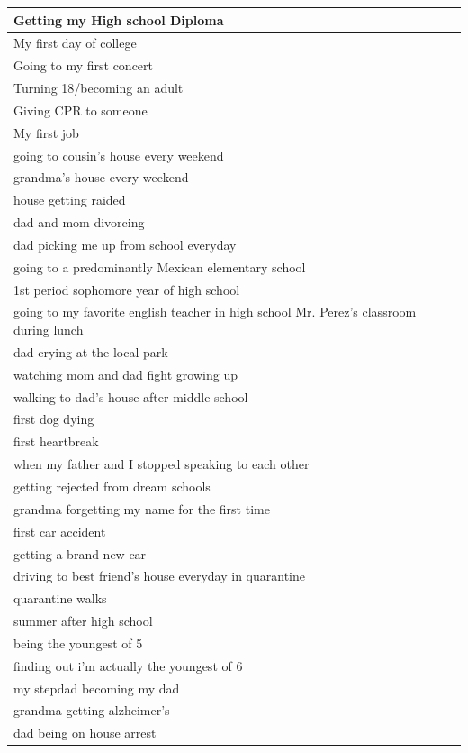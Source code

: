 \documentclass[
  .7em,
  letterpaper,
  DIV=11,
  numbers=noendperiod]{scrartcl}
\begin{document}
\begin{table}
\begin{tabular}{l}
\hline
Getting my High school Diploma\\
\hline
My first day of college\\
\hline
Going to my first concert\\
\hline
Turning 18/becoming an adult\\
\hline
Giving CPR to someone\\
\hline
My first job\\
\hline
going to cousin's house every weekend\\
\hline
grandma's house every weekend\\
\hline
house getting raided\\
\hline
dad and mom divorcing\\
\hline
dad picking me up from school everyday\\
\hline
going to a predominantly Mexican elementary school\\
\hline
1st period sophomore year of high school\\
\hline
going to my favorite english teacher in high school Mr. Perez's classroom during lunch\\
\hline
dad crying at the local park\\
\hline
watching mom and dad fight growing up\\
\hline
walking to dad's house after middle school\\
\hline
first dog dying\\
\hline
first heartbreak\\
\hline
when my father and I stopped speaking to each other\\
\hline
getting rejected from dream schools\\
\hline
grandma forgetting my name for the first time\\
\hline
first car accident\\
\hline
getting a brand new car\\
\hline
driving to best friend's house everyday in quarantine\\
\hline
quarantine walks\\
\hline
summer after high school\\
\hline
being the youngest of 5\\
\hline
finding out i'm actually the youngest of 6\\
\hline
my stepdad becoming my dad\\
\hline
grandma getting alzheimer's\\
\hline
dad being on house arrest\\

\end{tabular}
\end{table}
\end{document}
